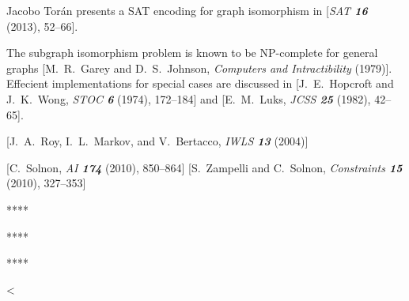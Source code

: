

\medskip{}  Jacobo Tor\'an presents a SAT encoding
for graph isomorphism in [{\sl SAT\/ \bf 16} (2013), 52--66].

The subgraph isomorphism problem is known to be NP-complete for general graphs
[M.\ R.\ Garey and D.\ S.\ Johnson, {\sl Computers and Intractibility} (1979)].
Effecient implementations for special cases are discussed in [J.\ E.\ Hopcroft
and J.\ K.\ Wong, {\sl STOC\/ \bf 6} (1974), 172--184] and [E.\ M.\ Luks, {\sl
JCSS\/ \bf 25} (1982), 42--65].

[J.\ A.\ Roy, I.\ L.\ Markov, and V.\ Bertacco, {\sl IWLS\/ \bf 13} (2004)]

[C.\ Solnon, {\sl AI\/ \bf 174} (2010), 850--864]  [S.\ Zampelli and C.\ Solnon, {\sl Constraints\/ \bf 15} (2010), 327--353]

\medskip{}

\centerline{****}


\centerline{****}


\centerline{****}




\bye
<